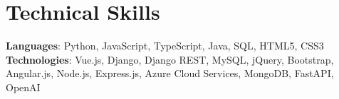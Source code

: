 \section{Technical Skills}
    \begin{itemize}[leftmargin=0.15in, label={}]
	\small{\item{
		\textbf{Languages}{: Python, JavaScript, TypeScript, Java, SQL, HTML5, CSS3} \\
		\textbf{Technologies}{: Vue.js, Django, Django REST, MySQL, jQuery, Bootstrap,  Angular.js, Node.js, Express.js, Azure Cloud Services, MongoDB, FastAPI, OpenAI} \\
	}}
    \end{itemize}